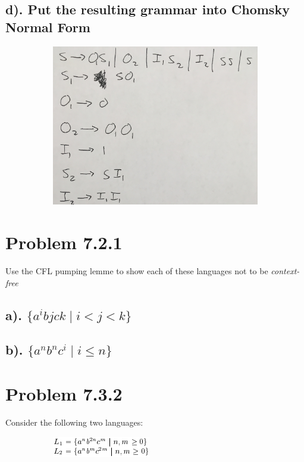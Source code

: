 \documentclass[20pt]{article} %
\begin{document}
\subsection{d). Put the resulting grammar into Chomsky Normal Form}
\begin{figure}[!htbp]
  	\centering
   	\begin{subfigure}[p]{0.5\linewidth}
    	\includegraphics[width=\linewidth]{./figures/h8-4.jpg}
   	\end{subfigure}
\end{figure}
\section{Problem 7.2.1}
Use the CFL pumping lemme to show each of these languages not to be \textit{context-free}
\subsection{a). $\{ a^{i} b{j} c{k} \mid i < j < k \}$}
\subsection{b). $\{ a^{n} b^{n} c^{i} \mid i \leq n \}$}
\section{Problem 7.3.2}
Consider the following two languages:
\begin{figure}[!htbp]
  	\centering
   	\begin{subfigure}[p]{0.33\linewidth}
    	\includegraphics[width=\linewidth]{./figures/HW8fig2.png}
   	\end{subfigure}
\end{figure} 
\end{document}
